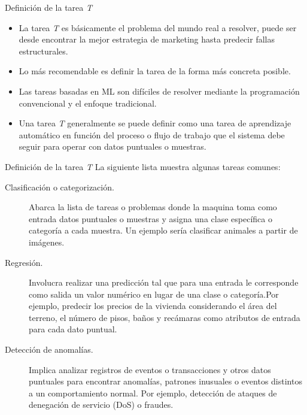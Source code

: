 \documentclass[11pt,aspectratio=169]{beamer}
\begin{document}
\begin{frame}{Definición de la tarea \textit{T}}
\begin{itemize}
	\item La tarea \textit{T} es básicamente el problema del mundo real a resolver, puede ser desde encontrar la mejor estrategia de marketing 
		hasta predecir fallas estructurales.\pause
	\item Lo más recomendable es definir la tarea de la forma más concreta posible.\pause
 	\item Las tareas basadas en ML son difíciles de resolver mediante la programación convencional y el enfoque tradicional.\pause
	\item Una tarea \textit{T} generalmente se puede definir como una tarea de aprendizaje automático en función del proceso o flujo de trabajo 
		que el sistema debe seguir para operar con datos puntuales o muestras. 
\end{itemize}
\end{frame}

\begin{frame}{Definición de la tarea \textit{T}}
La siguiente lista muestra algunas tareas comunes:
\begin{description}
	\item[Clasificación o categorización.] Abarca la lista de tareas o problemas donde la maquina toma como entrada datos puntuales o muestras y asigna
		una clase específica o categoría a cada muestra. \pause Un ejemplo sería clasificar animales a partir de imágenes.\pause
	\item[Regresión.] Involucra realizar una predicción tal que para una entrada le corresponde como salida un valor numérico en lugar 
		de una clase o categoría.\pause Por ejemplo, predecir los precios de la vivienda considerando el área del terreno, el número de pisos, baños y recámaras
		como atributos de entrada para cada dato puntual.\pause
	\item[Detección de anomalías. ] Implica analizar registros de eventos o transacciones y otros datos puntuales para encontrar anomalías,
		patrones inusuales o eventos distintos a un comportamiento normal. \pause Por ejemplo, detección de ataques de denegación de servicio (DoS) o fraudes.
\end{description}
\end{frame}
\end{document}
